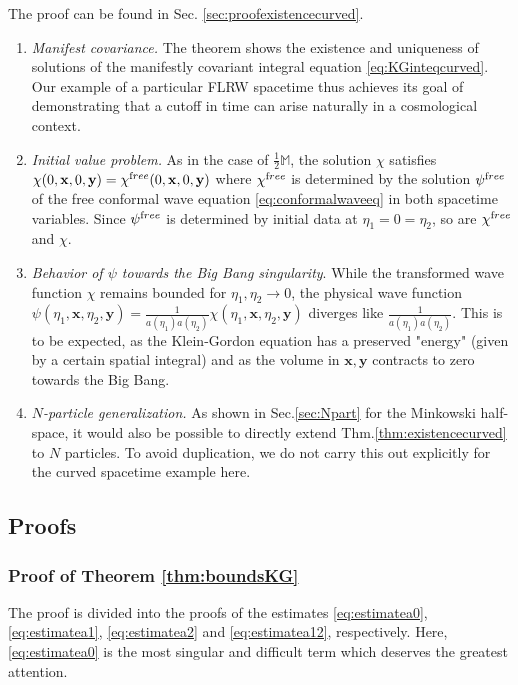 \documentclass[b5paper,draft,openbib,12pt]{memoir}
\newenvironment{Remarks}[1][Remarks:]{\begin{trivlist}
\item[\hskip \labelsep {\bfseries #1}]}{\end{trivlist}}
\newcommand{\M}{\mathbb{M}}
\newcommand{\vx}{\mathbf{x}}
\newcommand{\vy}{\mathbf{y}}
\newcommand{\free}{{\textup free}}
\begin{document}
The proof can be found in Sec.\@ 
\ref{sec:proofexistencecurved}.

\begin{Remarks}
	\begin{enumerate}
    \item \textit{Manifest covariance.} The theorem 
    shows the existence and uniqueness of solutions 
    of the manifestly covariant integral equation 
    \eqref{eq:KGinteqcurved}. Our example of a particular 
    FLRW spacetime thus achieves its goal of 
    demonstrating that a cutoff in time can arise 
    naturally in a cosmological context.
    \item \textit{Initial value problem.} As in the 
    case of $\tfrac{1}{2}\M$, the solution $\chi$ 
    satisfies $\chi(0,\vx,0,\vy) = 
    \chi^\free(0,\vx,0,\vy)$ where $\chi^\free$ is 
    determined by the solution $\psi^\free$ of the 
    free conformal wave equation 
    \eqref{eq:conformalwaveeq} in both spacetime 
    variables. Since $\psi^\free$ is determined by 
    initial data at $\eta_1 = 0 =\eta_2$, so are 
    $\chi^\free$ and $\chi$.
    \item \textit{Behavior of $\psi$ towards the Big 
    Bang singularity}. While the transformed wave 
    function $\chi$ remains bounded for $\eta_1, 
    \eta_2 \rightarrow 0$, the physical wave function 
    $\psi(\eta_1,\vx,\eta_2,\vy) = 
    \frac{1}{a(\eta_1)a(\eta_2)} 
    \chi(\eta_1,\vx,\eta_2,\vy)$ diverges like 
    $\frac{1}{a(\eta_1)a(\eta_2)}$. This is to be 
    expected, as the Klein-Gordon equation has a 
    preserved "energy" (given by a certain spatial 
    integral) and as the volume in $\vx, \vy$ 
    contracts to zero towards the Big Bang.
    \item \textit{$N$-particle generalization.} As 
    shown in Sec.\@ \ref{sec:Npart} for the \linebreak 
    Minkowski 
    half-space, it would also be possible to directly extend 
    Thm.\@ \ref{thm:existencecurved} to $N$ particles. 
    To avoid duplication, we do not carry this out 
    explicitly for the curved spacetime example here.
	\end{enumerate}
\end{Remarks}


\subsection{Proofs}
\label{sec:KG proofs}

\subsubsection{Proof of Theorem \ref{thm:boundsKG}} 
\label{sec:proofbounds}
The proof is divided into the proofs of the estimates 
\eqref{eq:estimatea0}, \eqref{eq:estimatea1}, 
\eqref{eq:estimatea2} and \eqref{eq:estimatea12}, 
respectively. Here, \eqref{eq:estimatea0} is the most 
singular and difficult term which deserves the greatest 
attention.
\end{document}
